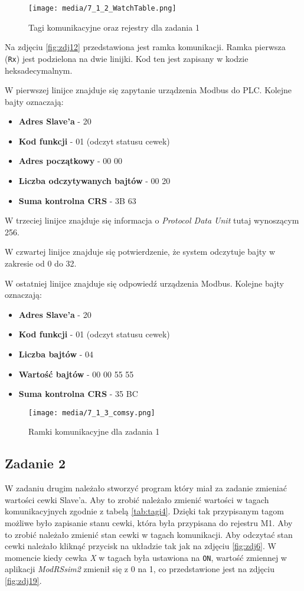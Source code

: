 \documentclass{article}
\begin{document}
\begin{figure}[H]
    \centering
    \texttt{[image: media/7\_1\_2\_WatchTable.png]}
    \caption{Tagi komunikacyjne oraz rejestry dla zadania 1}
    \label{fig:zdj17}
\end{figure}

\newpage
Na zdjęciu \ref{fig:zdj12} przedstawiona jest ramka komunikacji. Ramka pierwsza (\texttt{Rx}) jest podzielona na dwie linijki. Kod ten jest zapisany w kodzie heksadecymalnym. 

W pierwszej linijce znajduje się zapytanie urządzenia Modbus do PLC. Kolejne bajty oznaczają:
\begin{itemize}
    \item \textbf{Adres Slave'a} - 20
    \item \textbf{Kod funkcji} - 01 (odczyt statusu cewek)
    \item \textbf{Adres początkowy} - 00 00
    \item \textbf{Liczba odczytywanych bajtów} - 00 20
    \item \textbf{Suma kontrolna CRS} - 3B 63
\end{itemize}

W trzeciej linijce znajduje się informacja o \textit{Protocol Data Unit} tutaj wynoszącym 256.

W czwartej linijce znajduje się potwierdzenie, że system odczytuje bajty w zakresie od 0 do 32.

W ostatniej linijce znajduje się odpowiedź urządzenia Modbus. Kolejne bajty oznaczają:
\begin{itemize}
    \item \textbf{Adres Slave'a} - 20
    \item \textbf{Kod funkcji} - 01 (odczyt statusu cewek)
    \item \textbf{Liczba bajtów} - 04 
    \item \textbf{Wartość bajtów} - 00 00 55 55
    \item \textbf{Suma kontrolna CRS} - 35 BC
\end{itemize}



\begin{figure}[H]
    \centering
    \texttt{[image: media/7\_1\_3\_comsy.png]}
    \caption{Ramki komunikacyjne dla zadania 1}
    \label{fig:zdj18}
\end{figure}
\newpage
\subsection{Zadanie 2}
W zadaniu drugim należało stworzyć program który miał za zadanie zmieniać wartości cewki Slave'a. Aby to zrobić należało zmienić wartości w tagach komunikacyjnych zgodnie z tabelą \ref{tab:tagi4}. Dzięki tak przypisanym tagom możliwe było zapisanie stanu cewki, która była przypisana do rejestru M1. Aby to zrobić należało zmienić stan cewki w tagach komunikacji. Aby odczytać stan cewki należało kliknąć przycisk na układzie tak jak na zdjęciu \ref{fig:zdj6}. W momencie kiedy cewka \textit{X} w tagach była ustawiona na \texttt{ON}, wartość zmiennej w aplikacji \textit{ModRSsim2} zmienił się z 0 na 1, co przedstawione jest na zdjęciu \ref{fig:zdj19}.
\end{document}

